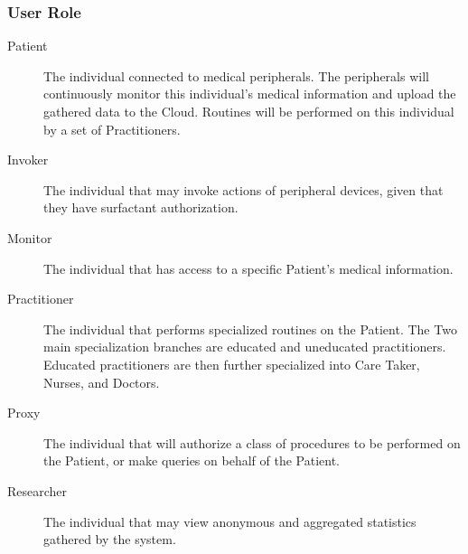 \subsubsection{User Role}
\begin{description}
	\item [Patient] The individual connected to medical peripherals. The peripherals will continuously monitor this individual's medical information and upload the gathered data to the Cloud. Routines will be performed on this individual by a set of Practitioners.
	\item [Invoker] The individual that may invoke actions of peripheral devices, given that they have surfactant authorization.
	\item [Monitor] The individual that has access to a specific Patient's medical information.
	\item [Practitioner] The individual that performs specialized routines on the Patient. The Two main specialization branches are educated and uneducated practitioners. Educated practitioners are then further specialized into Care Taker, Nurses, and Doctors.
	\item [Proxy] The individual that will authorize a class of procedures to be performed on the Patient, or make queries on behalf of the Patient.
	\item [Researcher] The individual that may view anonymous and aggregated statistics gathered by the system.
\end{description}